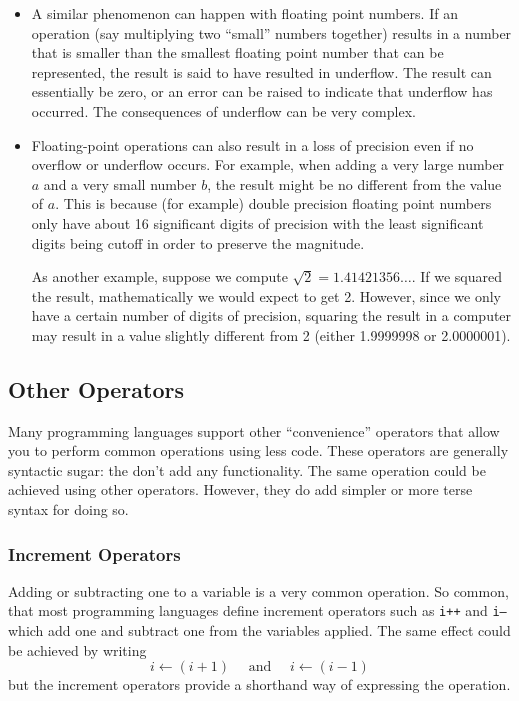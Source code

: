 \begin{itemize}
  \item A similar phenomenon can happen with floating point numbers.  If an operation
  (say multiplying two ``small'' numbers together) results in a number that is smaller
  than the smallest 
floating point number that can be represented, the result is said
  to have resulted in  \gls{underflow}.  The result can essentially be zero, or an error 
  can be raised to indicate that underflow has occurred.  The consequences of 
  underflow can be very complex.
  
  \item Floating-point operations can also result in a loss of precision even if no overflow
  or underflow occurs.  For example, when adding a very large number $a$ and a very small 
  number $b$, the result might be no different from the value of $a$.  This is because 
  (for example) double precision 
floating point numbers only have about 16 significant 
  digits of precision with the least significant digits being cutoff in order to preserve the 
  magnitude.
  
  As another example, suppose we compute $\sqrt{2} = 1.41421356\ldots$.  If we
  squared the result, mathematically we would expect to get 2.  However, since we
  only have a certain number of digits of precision, squaring the result in a 
  computer may result in a value slightly different from 2 (either 1.9999998 or 2.0000001).

\end{itemize}

\subsection{Other Operators}

Many programming languages support other ``convenience'' operators that 
allow you to perform common operations using less code.  These operators
are generally  \gls{syntactic sugar}: the don't 
add any functionality.  The same operation could be achieved using other 
operators.  However, they do add simpler or more terse syntax for doing so.

\subsubsection{Increment Operators}
\label{subsubsection:incrementOperators}
 
Adding or subtracting one to a variable is a very common operation.  So common, 
that most programming languages define increment operators such as \texttt{i++} 
and \texttt{i--} which add one and subtract one from the variables applied.  
The same effect could be achieved by writing 
   $$i\leftarrow (i+1) \quad \text{ and } \quad i \leftarrow (i-1)$$
but the increment operators provide a shorthand way of expressing the operation.


